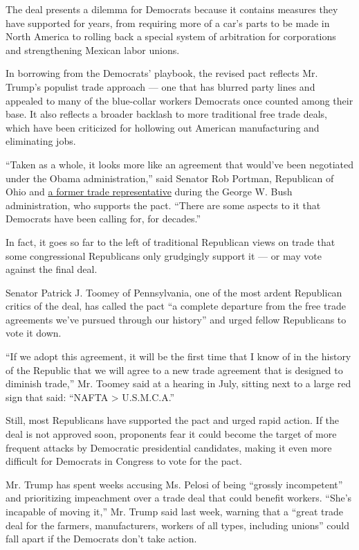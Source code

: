 The deal presents a dilemma for Democrats because it contains measures
they have supported for years, from requiring more of a car's parts to
be made in North America to rolling back a special system of arbitration
for corporations and strengthening Mexican labor unions.

In borrowing from the Democrats' playbook, the revised pact reflects Mr.
Trump's populist trade approach --- one that has blurred party lines and
appealed to many of the blue-collar workers Democrats once counted among
their base. It also reflects a broader backlash to more traditional free
trade deals, which have been criticized for hollowing out American
manufacturing and eliminating jobs.

``Taken as a whole, it looks more like an agreement that would've been
negotiated under the Obama administration,'' said Senator Rob Portman,
Republican of Ohio and
\href{https://www.nytimes.com/2005/03/18/business/congressman-from-ohio-is-chosen-for-trade-post.html}{a
former trade representative} during the George W. Bush administration,
who supports the pact. ``There are some aspects to it that Democrats
have been calling for, for decades.''

In fact, it goes so far to the left of traditional Republican views on
trade that some congressional Republicans only grudgingly support it ---
or may vote against the final deal.

Senator Patrick J. Toomey of Pennsylvania, one of the most ardent
Republican critics of the deal, has called the pact ``a complete
departure from the free trade agreements we've pursued through our
history'' and urged fellow Republicans to vote it down.

``If we adopt this agreement, it will be the first time that I know of
in the history of the Republic that we will agree to a new trade
agreement that is designed to diminish trade,'' Mr. Toomey said at a
hearing in July, sitting next to a large red sign that said: ``NAFTA
\textgreater{} U.S.M.C.A.''

Still, most Republicans have supported the pact and urged rapid action.
If the deal is not approved soon, proponents fear it could become the
target of more frequent attacks by Democratic presidential candidates,
making it even more difficult for Democrats in Congress to vote for the
pact.

Mr. Trump has spent weeks accusing Ms. Pelosi of being ``grossly
incompetent'' and prioritizing impeachment over a trade deal that could
benefit workers. ``She's incapable of moving it,'' Mr. Trump said last
week, warning that a ``great trade deal for the farmers, manufacturers,
workers of all types, including unions'' could fall apart if the
Democrats don't take action.

